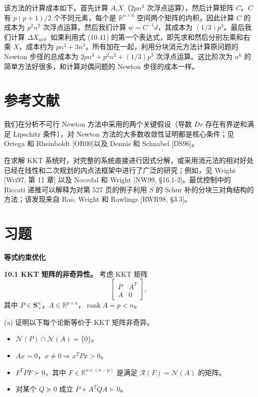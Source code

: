 \documentclass[UTF8,12pt,a4paper,fontset=fandol]{ctexart}
\begin{document}
该方法的计算成本如下。首先计算 $A_iX$（$2pn^3$ 次浮点运算），然后计算矩阵 $C$。$C$ 有 $p(p+1)/2$ 个不同元素，每个是 $\mathbb{R}^{n\times n}$ 空间两个矩阵的内积，因此计算 $C$ 的成本为 $p^2n^2$ 次浮点运算。然后我们计算 $w=C^{-1}d$，其成本为 $(1/3)p^3$。最后我们计算 $\Delta X_{\mathrm{nt}}$。如果利用式 (10.41) 的第一个表达式，即先求和然后分别左乘和右乘 $X$，成本约为 $pn^2+3n^3$。所有加在一起，利用分块消元方法计算原问题的 Newton 步径的总成本为 $2pn^3+p^2n^2+(1/3)p^3$ 次浮点运算。这比阶次为 $n^6$ 的简单方法好很多，和计算对偶问题的 Newton 步径的成本一样。

\section*{参考文献}

我们在分析不可行 Newton 方法中采用的两个关键假设（导数 $Dr$ 存在有界逆和满足 Lipschitz 条件），对 Newton 方法的大多数收敛性证明都是核心条件；见 Ortega 和 Rheinboldt [OR00]以及 Dennis 和 Schnabel [DS96]。

在求解 KKT 系统时，对完整的系统直接进行因式分解，或采用消元法的相对好处已经在线性和二次规划的内点法框架中进行了广泛的研究；例如，见 Wright [Wri97, 第 11 章] 以及 Nocedal 和 Wright [NW99, \S16.1-2]。最优控制中的 Riccati 递推可以解释为对第 527 页的例子利用 $S$ 的 Schur 补的分块三对角结构的方法；该发现来自 Rao, Wright 和 Rawlings [RWR98, \S3.3]。

\section*{习题}

\noindent\textbf{等式约束优化}

\noindent\textbf{10.1 KKT 矩阵的非奇异性。}\quad
考虑 KKT 矩阵
\[
\begin{bmatrix}
P&A^T\\
A&0
\end{bmatrix},
\]
其中 $P\in\mathbf{S}_+^n$，$A\in\mathbb{R}^{p\times n}$，$\operatorname{rank}A=p<n$。

(a) 证明以下每个论断等价于 KKT 矩阵非奇异。
\begin{itemize}
\item $\mathcal{N}(P)\cap\mathcal{N}(A)=\{0\}$。
\item $Ax=0$，$x\neq0\Longrightarrow x^TPx>0$。
\item $F^TPF\succ0$，其中 $F\in\mathbb{R}^{n\times(n-p)}$ 是满足 $\mathcal{R}(F)=\mathcal{N}(A)$ 的矩阵。
\item 对某个 $Q\succeq0$ 成立 $P+A^TQA\succ0$。
\end{itemize}
\end{document}
